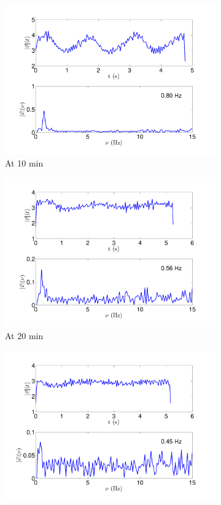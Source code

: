 \documentclass[12pt]{article}
\begin{document}
\begin{figure}[h!]
\begin{subfigure}[h!]{0.5\textwidth}
       \includegraphics[scale=0.3]{voft_ps_10min.pdf}
       \caption{At 10 min}
       \label{fig:vs10min}
	\end{subfigure}
	\hfill
	\begin{subfigure}[h!]{0.5\textwidth}
    \centering
       \includegraphics[scale=0.3]{voft_ps_20min.pdf}
       \caption{At 20 min}
       \label{fig:vs20min}
	\end{subfigure}
	\newline
	\begin{subfigure}[h!]{\textwidth}
    \centering
       \includegraphics[scale=0.3]{voft_ps_30min.pdf}

\end{subfigure}
\end{figure}
\end{document}
